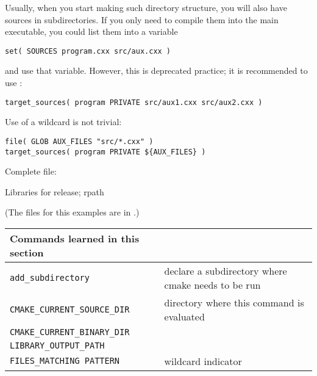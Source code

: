 \begin{floatingfigure}[r]{2.5in}\vskip3in\end{floatingfigure}
%
Usually, when you start making such directory structure,
you will also have sources in subdirectories.
If you only need to compile them into the main executable,
you could list them into a variable
\begin{lstlisting}
set( SOURCES program.cxx src/aux.cxx )
\end{lstlisting}
and use that variable.
However, this is deprecated practice;
it is recommended to use :
\begin{lstlisting}
target_sources( program PRIVATE src/aux1.cxx src/aux2.cxx )
\end{lstlisting}
Use of a wildcard is not trivial:
\begin{lstlisting}
file( GLOB AUX_FILES "src/*.cxx" )
target_sources( program PRIVATE ${AUX_FILES} )
\end{lstlisting}

Complete  file:
%


\newpage
{} {Libraries for release; rpath}
\label{sec:cmake-install-dirs}
\label{sec:cmake-rpath}

(The files for this examples are in .)

\begin{tabular}{lp{3in}}
  \toprule
  Commands learned in this section\\
  \midrule
  \lstinline+add_subdirectory+&declare a subdirectory where cmake needs to be run\\
  \lstinline+CMAKE_CURRENT_SOURCE_DIR+&directory where this command is evaluated\\
  \lstinline+CMAKE_CURRENT_BINARY_DIR+&\\
  \lstinline+LIBRARY_OUTPUT_PATH+&\\
  \lstinline+FILES_MATCHING PATTERN+&wildcard indicator\\
  \bottomrule
\end{tabular}

